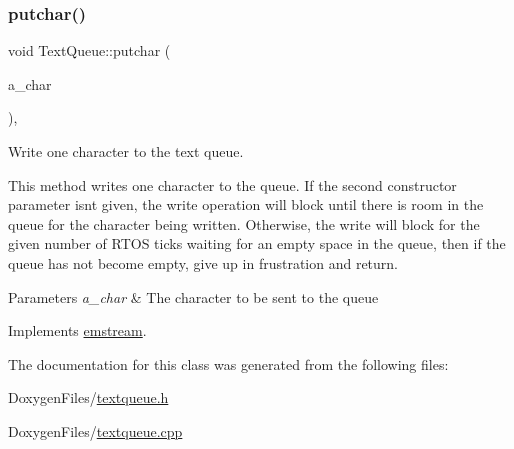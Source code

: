\subsubsection{\texorpdfstring{putchar()}{putchar()}}
{\footnotesize\ttfamily void Text\+Queue\+::putchar (\begin{DoxyParamCaption}\item[{char}]{a\+\_\+char }\end{DoxyParamCaption})\hspace{0.3cm}{\ttfamily [inline]}, {\ttfamily [virtual]}}



Write one character to the text queue. 

This method writes one character to the queue. If the second constructor parameter isn\textquotesingle{}t given, the write operation will block until there is room in the queue for the character being written. Otherwise, the write will block for the given number of R\+T\+OS ticks waiting for an empty space in the queue, then if the queue has not become empty, give up in frustration and return. 
\begin{DoxyParams}{Parameters}
{\em a\+\_\+char} & The character to be sent to the queue \\
\hline
\end{DoxyParams}


Implements \mbox{\hyperlink{classemstream_aa4dffc9aa58f601cc4153b4cbe65d757}{emstream}}.



The documentation for this class was generated from the following files\+:\begin{DoxyCompactItemize}
\item 
Doxygen\+Files/\mbox{\hyperlink{textqueue_8h}{textqueue.\+h}}\item 
Doxygen\+Files/\mbox{\hyperlink{textqueue_8cpp}{textqueue.\+cpp}}\end{DoxyCompactItemize}
